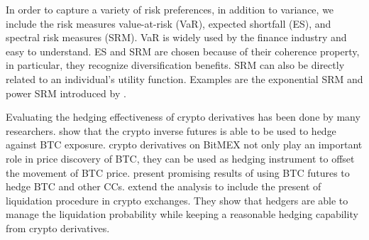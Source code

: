 \documentclass[11pt,a4paper,english]{article}
\providecommand{\natp}[1]{\textcolor{darkorange}{#1}}
\begin{document}
In order to capture a variety of risk preferences, in addition to
variance, we include the risk measures value-at-risk (VaR), expected
shortfall (ES), and spectral risk measures (SRM). 
VaR is widely used by the finance industry and easy to understand. 
ES and SRM are chosen because of their coherence property, in
particular, they recognize diversification benefits.
SRM can also be directly related to an individual's utility function.
Examples are the exponential SRM and power SRM introduced by
\citet{dowd2008spectral}. 

%

Evaluating the hedging effectiveness of crypto derivatives has been done by many researchers. 
\citet{deng2020minimum} show that the crypto inverse futures is able to be used to hedge against BTC exposure.
\citet{alexander2020bitmex} crypto derivatives on BitMEX not only play an important role in price discovery of BTC,
 they can be used as hedging instrument to offset the movement of BTC price. 
\citet{sebastiao2020bitcoin} present promising results of using BTC futures to hedge BTC and other CCs. 
\citet{alexander2021hedging} extend the analysis to include the present of liquidation procedure in crypto exchanges. 
They show that hedgers are able to manage the liquidation probability while keeping a reasonable hedging capability from crypto derivatives. 
\end{document}
